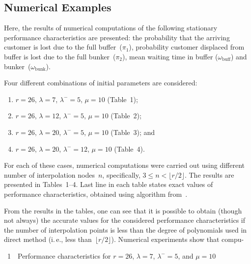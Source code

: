\begin{multicols}{2}
\vspace*{-6pt}

\section{Numerical Examples}

\noindent
Here, the results of numerical computations of the following stationary 
performance characteristics are presented:
the probability that the arriving customer is lost due to the full buffer~($\pi_{1}$),
probability customer displaced from buffer is lost due to the full bunker~($\pi_{2}$), 
mean waiting time in buffer ($\omega_{\mathrm{buff}}$) and bunker~($\omega_{\mathrm{bunk}}$).

Four different combinations of initial parameters are considered: 
\begin{enumerate}[(1)]
  \item $r=26$, $\lambda=7$, $\lambda^-=5$, $\mu=10$ (Table~1);
  \item $r=26$, $\lambda=12$, $\lambda^-=5$, $\mu=10$ (Table~2);
  \item $r=26$, $\lambda=20$, $\lambda^-=5$, $\mu=10$ (Table~3); and
  \item $r=26$, $\lambda=20$, $\lambda^-=12$, $\mu=10$ (Table~4).
\end{enumerate}
For each of these cases, numerical computations were carried out
using different number of interpolation nodes~$n$, specifically, $3 \le n < \lfloor r /2\rfloor$.
The results are presented in Tables~1--4.
Last line in each table states exact values of performance
characteristics, obtained using algorithm from~\cite{aaa6}.


From the results in the tables, one can see that {it is possible 
to obtain (though not always)} the accurate
values for the considered performance characteristics if
the number of interpolation points is less than
the degree of polynomials used in direct method (i.\,e., less
than~$\lfloor{r/2}\rfloor$). Numerical experiments
show that compu-\linebreak\vspace*{-12pt}

\pagebreak


\noindent
{{\tablename~1}\ \ \small{Performance characteristics for $r=26$, $\lambda=7$, $\lambda^-=5$, and $\mu=10$}}
 
 \vspace*{-3pt}


\end{multicols}

